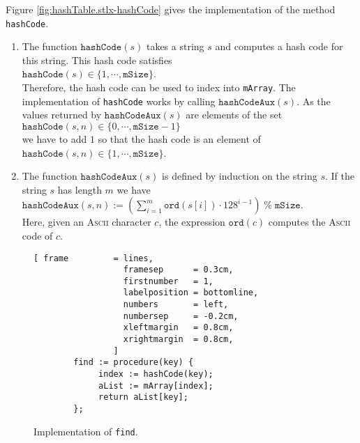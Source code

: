 Figure \ref{fig:hashTable.stlx-hashCode} gives the implementation of the method \texttt{hashCode}.
\begin{enumerate}
\item The function $\texttt{hashCode}(s)$ takes a string $s$ and computes a hash code for this string.
      This hash code satisfies
      \\[0.2cm]
      \hspace*{1.3cm}
      $\mathtt{hashCode}(s) \in \{ 1, \cdots, \mathtt{mSize} \}$.
      \\[0.2cm]
      Therefore, the hash code can be used to index into \texttt{mArray}.  The implementation of
      \texttt{hashCode} works by calling $\texttt{hashCodeAux}(s)$.  As the values returned by
      $\texttt{hashCodeAux}(s)$ are elements of the set
      \\[0.2cm]
      \hspace*{1.3cm}
      $\mathtt{hashCode}(s,n) \in \{ 0, \cdots, \mathtt{mSize}-1 \}$      
      \\[0.2cm]
      we have to add $1$ so that the hash code is an element of 
      \\[0.2cm]
      \hspace*{1.3cm}
      $\mathtt{hashCode}(s,n) \in \{ 1, \cdots, \mathtt{mSize} \}$.      
\item The function $\mathtt{hashCodeAux}(s)$ is defined by induction on the string $s$.
      If the string $s$ has length $m$ we have
      \\[0.2cm]
      \hspace*{1.3cm}
      $\mathtt{hashCodeAux}(s,n) := \left(\sum\limits_{i=1}^m \mathtt{ord}(s[i]) \cdot 128^{i-1}\right) \;\mathtt{\%}\; \mathtt{mSize}$.
      \\[0.2cm]
      Here, given an \textsc{Ascii} character $c$, the expression  $\mathtt{ord}(c)$ computes the
      \textsc{Ascii} code of  $c$.
\end{enumerate}

\begin{figure}[!ht]
\centering
\begin{Verbatim}[ frame         = lines, 
                  framesep      = 0.3cm, 
                  firstnumber   = 1,
                  labelposition = bottomline,
                  numbers       = left,
                  numbersep     = -0.2cm,
                  xleftmargin   = 0.8cm,
                  xrightmargin  = 0.8cm,
                ]
        find := procedure(key) {
             index := hashCode(key);
             aList := mArray[index];
             return aList[key];
        };
\end{Verbatim}
\vspace*{-0.3cm}
\caption{Implementation of \texttt{find}.}
\label{fig:hashTable.stlx-find}
\end{figure}

